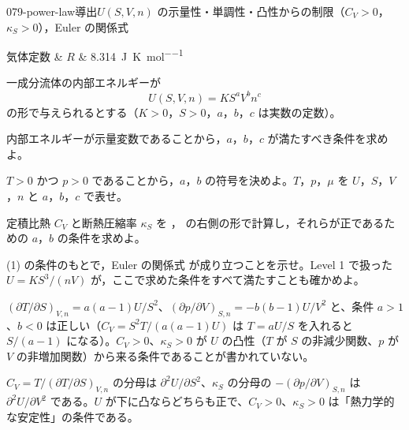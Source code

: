 \documentclass[uplatex,dvipdfmx,a4paper,11pt]{jsarticle}
\begin{document}
\begin{mondai}{079-power-law}{導出}{$U(S,V,n)$ の示量性・単調性・凸性からの制限（$C_{V}>0$，$\kappa_{S}>0$），Euler の関係式}
\begin{teisuu}
  気体定数 & $R$ & \qty{8.314}{\joule\per\kelvin\per\mole}\\
\end{teisuu}
一成分流体の内部エネルギーが
  \[ U(S,V,n) = KS^{a}V^{b}n^{c} \]
  の形で与えられるとする（$K > 0$，$S > 0$，$a$，$b$，$c$ は実数の定数）。
  \begin{shoumon}
    \item 内部エネルギーが示量変数であることから，$a$，$b$，$c$ が満たすべき条件を求めよ。
    \item $T > 0$ かつ $p > 0$ であることから，$a$，$b$ の符号を決めよ。$T$，$p$，$\mu$ を $U$，$S$，$V$，$n$ と $a$，$b$，$c$ で表せ。
    \item 定積比熱 $C_{V}$ と断熱圧縮率 $\kappa_{S}$ を ， の右側の形で計算し，それらが正であるための $a$，$b$ の条件を求めよ。
    \item (1) の条件のもとで，Euler の関係式  が成り立つことを示せ。Level 1 で扱った $U = KS^{3}/(nV)$ が，ここで求めた条件をすべて満たすことも確かめよ。
  \end{shoumon}

\begin{kotaeran}
   $(\partial T/\partial S)_{V,n}=a(a-1)U/S^{2}$、$(\partial p/\partial V)_{S,n}=-b(b-1)U/V^{2}$ と、条件 $a>1$、$b<0$ は正しい（$C_{V}=S^{2}T/(a(a-1)U)$ は $T=aU/S$ を入れると $S/(a-1)$ になる）。$C_{V}>0$、$\kappa_{S}>0$ が $U$ の凸性（$T$ が $S$ の非減少関数、$p$ が $V$ の非増加関数）から来る条件であることが書かれていない。
\end{kotaeran}
\begin{rikai}
  \item $C_{V}=T/(\partial T/\partial S)_{V,n}$ の分母は $\partial^{2}U/\partial S^{2}$、$\kappa_{S}$ の分母の $-(\partial p/\partial V)_{S,n}$ は $\partial^{2}U/\partial V^{2}$ である。$U$ が下に凸ならどちらも正で、$C_{V}>0$、$\kappa_{S}>0$ は「熱力学的な安定性」の条件である。
\end{rikai}
\end{mondai}
\end{document}
